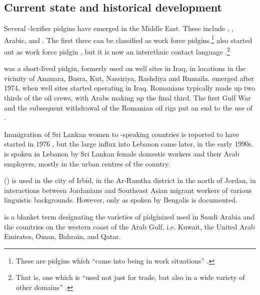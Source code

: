 \documentclass[output=paper]{langsci/langscibook}
\begin{document}
 \subsection{Current state and historical development}


Several -{lexifier} pidgins have emerged in the Middle East. These include  , ,  Arabic, and . The first three can be classified as work force pidgins.\footnote{These are pidgins which “came into being in work situations” \citep[28]{Bakker1995}.}  also started out as work force {pidgin} \citep[83]{Smart1990}, but it is now an interethnic contact language \citep[13]{Avram2014Pidgin}.\footnote{That is, one which is “used not just for trade, but also in a wide variety of other domains” \citep[28]{Bakker1995}.}

  \citep{Avram2010} was a short-lived {pidgin}, formerly used on  well sites in Iraq, in locations in the vicinity of Ammara, Basra, Kut, Nassiriya, Rashdiya and Rumaila.   emerged after 1974, when  well sites started operating in Iraq. Romanians typically made up two thirds of the oil crews, with Arabs making up the final third. The first Gulf War and the subsequent withdrawal of the {Romanian} oil rigs put an end to the use of  . 

Immigration of Sri Lankan women to -speaking countries is reported to have started in 1976 \citep[16]{Bizri2010}, but the large influx into Lebanon came later, in the early 1990s.  is spoken in Lebanon by Sri Lankan female domestic workers and their Arab employers, mostly in the urban centres of the country. 

    (\citealt{Al-Salman2013}) is used in the city of Irbid, in the Ar-Ramtha district in the north of Jordan, in interactions between Jordanians and Southeast Asian migrant workers of various linguistic backgrounds. However, only   as spoken by Bengalis is documented.  

 is a blanket term designating the varieties of pidginized  used in {Saudi Arabia} and the countries on the western coast of the Arab Gulf, i.e. Kuwait, the United Arab Emirates, Oman, Bahrain, and Qatar. 
\end{document}
